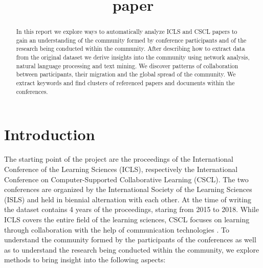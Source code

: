 \documentclass[article,twocolumn]{IEEEtran}
\title{paper}
\begin{document}
    
    
    
\renewcommand{\figurename}{Figure}
\captionsetup{labelformat=simple}\title{   }
\author{
}
\maketitle

    
    

    

\begin{abstract}
    In this report we explore ways to automatically analyze ICLS and CSCL
papers to gain an understanding of the community formed by conference
participants and of the research being conducted within the community.
After describing how to extract data from the original dataset we derive
insights into the community using network analysis, natural language
processing and text mining. We discover patterns of collaboration
between participants, their migration and the global spread of the
community. We extract keywords and find clusters of referenced papers
and documents within the conferences.
\end{abstract}
    \hypertarget{introduction}{%
\section{Introduction}\label{introduction}}

The starting point of the project are the proceedings of the
International Conference of the Learning Sciences (ICLS), respectively
the International Conference on Computer-Supported Collaborative
Learning (CSCL). The two conferences are organized by the International
Society of the Learning Sciences (ISLS) and held in biennial alternation
with each other. At the time of writing the dataset contains 4 years of
the proceedings, staring from 2015 to 2018. While ICLS covers the entire
field of the learning sciences, CSCL focuses on learning through
collaboration with the help of communication technologies \cite{ICLS}.
To understand the community formed by the participants of the
conferences as well as to understand the research being conducted within
the community, we explore methods to bring insight into the following
aspects:
\end{document}
